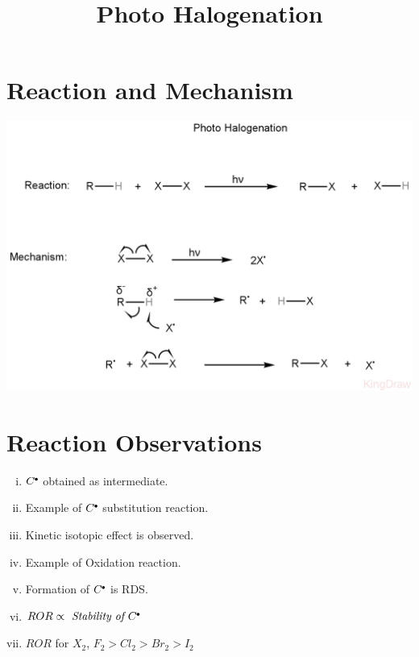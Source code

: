 \documentclass{article}
\title{Photo Halogenation}
\author{}
\date{}
\newcommand*\fullcirc[1][0.3ex]{\tikz\fill (0,0) circle (#1);}
\begin{document}
\maketitle

\section{Reaction and Mechanism}
\begin{center}
    \includegraphics[scale=0.3]{PhotoHalogenanion_1722173018626.JPEG}
\end{center}

\section{Reaction Observations}
\begin{enumerate}[i.]
    \item $C^{\fullcirc}$ obtained as intermediate.
    \item Example of $C^{\fullcirc}$ substitution reaction.
    \item Kinetic isotopic effect is observed.
    \item Example of Oxidation reaction.
    \item Formation of $C^{\fullcirc}$ is RDS.
    \item $ROR \propto \textit{ Stability of } C^{\fullcirc}$
    \item $ROR$ for $X_{2}$, $F_{2}>Cl_{2}>Br_{2}>I_{2}$
\end{enumerate}
\end{document}
